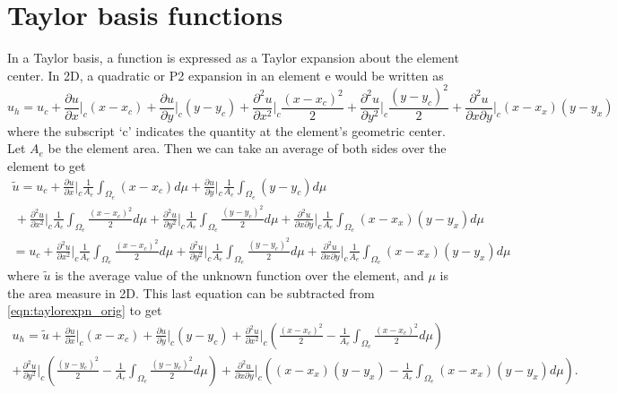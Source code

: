 \documentclass[11pt]{article}
\begin{document}
\section{Taylor basis functions}
In a Taylor basis, a function is expressed as a Taylor expansion about the element center. In 2D, a quadratic or P2 expansion in an element e would be written as
\begin{equation}
u_h = u_c + \frac{\partial u}{\partial x} \Big|_c(x-x_c) + \frac{\partial u}{\partial y} \Big|_c(y-y_c) + \frac{\partial^2 u}{\partial x^2} \Big|_c \frac{(x-x_c)^2}{2} + \frac{\partial^2 u}{\partial y^2} \Big|_c \frac{(y-y_c)^2}{2} + \frac{\partial^2 u}{\partial x\partial y} \Big|_c (x-x_x)(y-y_x)
\label{eqn:taylorexpn_orig}
\end{equation}
where the subscript `c' indicates the quantity at the element's geometric center. Let $A_e$ be the element area. Then we can take an average of both sides over the element to get
\begin{multline}
\tilde{u} = u_c + \frac{\partial u}{\partial x} \Big|_c \frac{1}{A_e}\int_{\Omega_e}(x-x_c)d\mu + \frac{\partial u}{\partial y} \Big|_c \frac{1}{A_e}\int_{\Omega_e} (y-y_c)d\mu \\ \, + \frac{\partial^2 u}{\partial x^2} \Big|_c \frac{1}{A_e}\int_{\Omega_e} \frac{(x-x_c)^2}{2}d\mu + \frac{\partial^2 u}{\partial y^2} \Big|_c \frac{1}{A_e}\int_{\Omega_e} \frac{(y-y_c)^2}{2}d\mu + \frac{\partial^2 u}{\partial x\partial y} \Big|_c \frac{1}{A_e}\int_{\Omega_e} (x-x_x)(y-y_x)d\mu \\
= u_c + \frac{\partial^2 u}{\partial x^2} \Big|_c \frac{1}{A_e}\int_{\Omega_e} \frac{(x-x_c)^2}{2}d\mu + \frac{\partial^2 u}{\partial y^2} \Big|_c \frac{1}{A_e}\int_{\Omega_e} \frac{(y-y_c)^2}{2}d\mu + \frac{\partial^2 u}{\partial x\partial y} \Big|_c \frac{1}{A_e}\int_{\Omega_e} (x-x_x)(y-y_x)d\mu
\end{multline}
where $\tilde{u}$ is the average value of the unknown function over the element, and $\mu$ is the area measure in 2D. This last equation can be subtracted from \eqref{eqn:taylorexpn_orig} to get
\begin{multline}
u_h = \tilde{u} + \frac{\partial u}{\partial x} \Big|_c(x-x_c) + \frac{\partial u}{\partial y} \Big|_c(y-y_c) + \frac{\partial^2 u}{\partial x^2} \Big|_c \left( \frac{(x-x_c)^2}{2} - \frac{1}{A_e}\int_{\Omega_e} \frac{(x-x_c)^2}{2}d\mu \right) \\ + \frac{\partial^2 u}{\partial y^2} \Big|_c \left( \frac{(y-y_c)^2}{2} -\frac{1}{A_e}\int_{\Omega_e} \frac{(y-y_c)^2}{2}d\mu \right) + \frac{\partial^2 u}{\partial x\partial y} \Big|_c \left( (x-x_x)(y-y_x) - \frac{1}{A_e}\int_{\Omega_e} (x-x_x)(y-y_x)d\mu \right).
\label{eqn:taylorexpn}
\end{multline}
\end{document}
